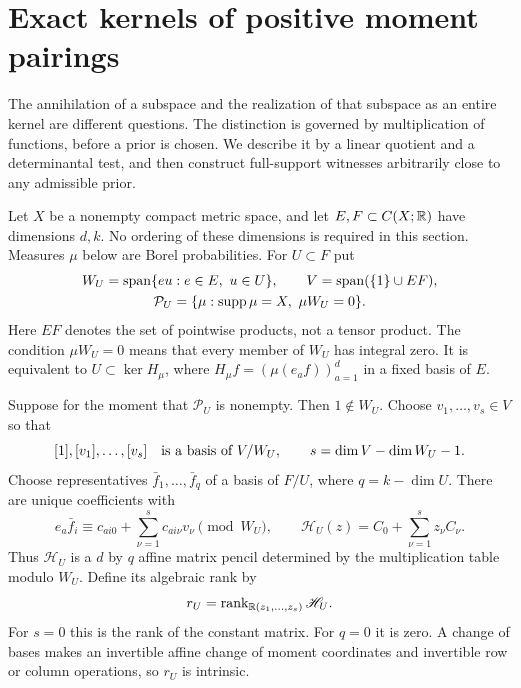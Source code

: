 \section{Exact kernels of positive moment pairings}
\label{sec:exact-kernels}
The annihilation of a subspace and the realization of that subspace as
an entire kernel are different questions. The distinction is governed
by multiplication of functions, before a prior is chosen. We describe
it by a linear quotient and a determinantal test, and then construct
full-support witnesses arbitrarily close to any admissible prior.

Let $X$ be a nonempty compact metric space, and let $E,F\subset C(X;\mathbb R)$
have dimensions $d,k$. No ordering of these dimensions is required in
this section. Measures $\mu$ below are Borel probabilities. For $U\subset F$ put
\begin{equation}\label{eq:kernel-product-spaces}
 \begin{gathered}
 W_U=\operatorname{span}\{eu:e\in E,\ u\in U\},\qquad
 V=\operatorname{span}(\{1\}\cup EF),\\
 \mathcal P_U=\{\mu:\operatorname{supp}\mu=X,\ \mu W_U=0\}.
 \end{gathered}
\end{equation}
Here $EF$ denotes the set of pointwise products, not a tensor product.
The condition $\mu W_U=0$ means that every member of $W_U$ has integral
zero. It is equivalent to $U\subset\ker H_\mu$, where
$H_\mu f=(\mu(e_a f))_{a=1}^d$ in a fixed basis of $E$.

Suppose for the moment that $\mathcal P_U$ is nonempty. Then
$1\notin W_U$. Choose $v_1,\ldots,v_s\in V$ so that
\[
 [1],[v_1],\ldots,[v_s]\quad\hbox{is a basis of }V/W_U,
 \qquad s=\dim V-\dim W_U-1.
\]
Choose representatives $\bar f_1,\ldots,\bar f_q$ of a basis of $F/U$,
where $q=k-\dim U$. There are unique coefficients with
\begin{equation}\label{eq:kernel-pencil}
 e_a\bar f_i\equiv c_{ai0}+\sum_{\nu=1}^s c_{ai\nu}v_\nu
       \pmod {W_U},\qquad
 \mathscr H_U(z)=C_0+\sum_{\nu=1}^s z_\nu C_\nu.
\end{equation}
Thus $\mathscr H_U$ is a $d$ by $q$ affine matrix pencil determined by
the multiplication table modulo $W_U$. Define its algebraic rank by
\begin{equation}\label{eq:kernel-generic-rank}
 r_U=\operatorname{rank}_{\mathbb R(z_1,\ldots,z_s)}\mathscr H_U.
\end{equation}
For $s=0$ this is the rank of the constant matrix. For $q=0$ it is zero.
A change of bases makes an invertible affine change of moment coordinates
and invertible row or column operations, so $r_U$ is intrinsic.

